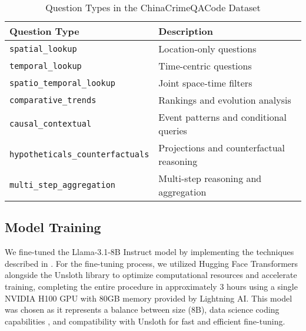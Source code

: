 \begin{table}[hbtp]
\centering
\caption{Question Types in the ChinaCrimeQACode Dataset}
\label{tab:question_types}
\begin{tabular}{ll}
\toprule
\textbf{Question Type} & \textbf{Description} \\
\midrule
\texttt{spatial\_lookup} & Location-only questions \\
\texttt{temporal\_lookup} & Time-centric questions \\
\texttt{spatio\_temporal\_lookup} & Joint space-time filters \\
\texttt{comparative\_trends} & Rankings and evolution analysis \\
\texttt{causal\_contextual} & Event patterns and conditional queries \\
\texttt{hypotheticals\_counterfactuals} & Projections and counterfactual reasoning \\
\texttt{multi\_step\_aggregation} & Multi-step reasoning and aggregation \\
\bottomrule
\end{tabular}
\end{table}


\subsection{Model Training}

We fine-tuned the Llama-3.1-8B Instruct model \cite{Grattafiori2024Llama3, Unsloth2024WhatModel} by implementing the techniques described in \cite{Pareja2024RecipesSFT}. For the fine-tuning process, we utilized Hugging Face Transformers alongside the Unsloth library to optimize computational resources and accelerate training, completing the entire procedure in approximately 3 hours using a single NVIDIA H100 GPU with 80GB memory provided by Lightning AI. This model was chosen as it represents a balance between size (8B), data science coding capabilities \cite{Lai2022DS1000}, and compatibility with Unsloth for fast and efficient fine-tuning.

